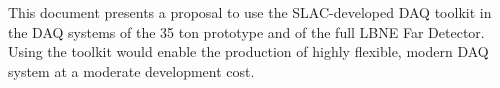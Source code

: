 This document presents a proposal to use the SLAC-developed DAQ toolkit 
in the DAQ systems of the 35 ton prototype and of the full LBNE Far Detector.
Using the toolkit would enable the production of highly flexible, modern DAQ
system at a moderate development cost.